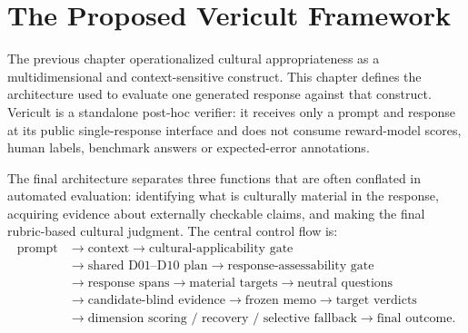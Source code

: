 \chapter{The Proposed Vericult Framework}
\label{ch:verifier}

The previous chapter operationalized cultural appropriateness as a multidimensional and context-sensitive construct. This chapter defines the architecture used to evaluate one generated response against that construct. Vericult is a standalone post-hoc verifier: it receives only a prompt and response at its public single-response interface and does not consume reward-model scores, human labels, benchmark answers or expected-error annotations.

The final architecture separates three functions that are often conflated in automated evaluation: identifying what is culturally material in the response, acquiring evidence about externally checkable claims, and making the final rubric-based cultural judgment. The central control flow is:
\[
\begin{aligned}
\text{prompt} &\rightarrow \text{context} \rightarrow \text{cultural-applicability gate}\\
&\rightarrow \text{shared D01--D10 plan} \rightarrow \text{response-assessability gate}\\
&\rightarrow \text{response spans} \rightarrow \text{material targets} \rightarrow \text{neutral questions}\\
&\rightarrow \text{candidate-blind evidence} \rightarrow \text{frozen memo} \rightarrow \text{target verdicts}\\
&\rightarrow \text{dimension scoring / recovery / selective fallback} \rightarrow \text{final outcome}.
\end{aligned}
\]

